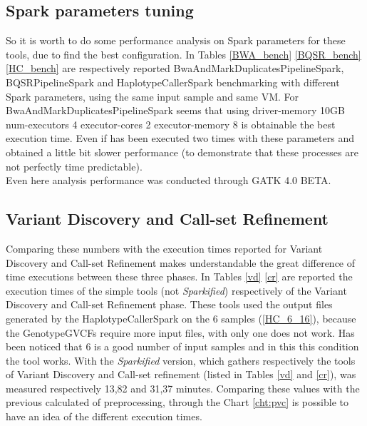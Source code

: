 \subsection{Spark parameters tuning}
So it is worth to do some performance analysis on Spark parameters for these tools, due to find the best configuration. In Tables \ref{BWA_bench} \ref{BQSR_bench} \ref{HC_bench} are respectively reported BwaAndMarkDuplicatesPipelineSpark, BQSRPipelineSpark and HaplotypeCallerSpark  benchmarking with different Spark parameters, using the same input sample and same VM.\newline
For BwaAndMarkDuplicatesPipelineSpark seems that using driver-memory 10GB num-executors 4 executor-cores 2 executor-memory 8 is obtainable the best execution time. Even if has been executed two times with these parameters and obtained a little bit slower performance (to demonstrate that these processes are not perfectly time predictable).
\\[1\baselineskip]
Even here analysis performance was conducted through GATK 4.0 BETA.

\subsection{Variant Discovery and Call-set Refinement}
Comparing these numbers with the execution times reported for Variant Discovery and Call-set Refinement makes understandable the great difference of time executions between these three phases. In Tables \ref{vd} \ref{cr} are reported the execution times of the simple tools (not \textit{Sparkified}) respectively of the Variant Discovery and Call-set Refinement phase. These tools used the output files generated by the HaplotypeCallerSpark on the 6 samples (\ref{HC_6_16}), because the GenotypeGVCFs require more input files, with only one does not work. Has been noticed that 6 is a good number of input samples and in this this condition the tool works.\newline
With the \textit{Sparkified} version, which gathers respectively the tools of Variant Discovery and Call-set refinement (listed in Tables \ref{vd} and \ref{cr}), was measured respectively 13,82 and 31,37 minutes. Comparing these values with the previous calculated of preprocessing, through the Chart \ref{cht:pvc} is possible to have an idea of the different execution times.

